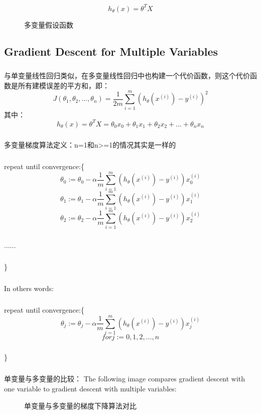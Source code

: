 \documentclass{article}
\begin{document}
\begin{CJK}{UTF8}{gbsn}
\begin{equation}
\end{equation}
\begin{equation}
h_\theta(x)=\theta^TX
\end{equation}
\begin{figure}[H]
\caption{多变量假设函数}
\label{fig:222}
\end{figure}
\subsection{Gradient Descent for Multiple Variables}
\subparagraph*{}
与单变量线性回归类似，在多变量线性回归中也构建一个代价函数，则这个代价函数是所有建模误差的平方和，即：
\begin{equation}
J(\theta_1,\theta_2,...,\theta_n)=\frac{1}{2m}\sum_{i=1}^m{(h_\theta(x^{(i)})-y^{(i)})^2}
\end{equation}
其中：
\begin{equation}
h_\theta(x)=\theta^TX=\theta_0x_0+\theta_1x_1+\theta_2x_2+...+\theta_nx_n
\end{equation}
\subparagraph*{}
多变量梯度算法定义：n=1和n>=1的情况其实是一样的
\subparagraph*{}
repeat until convergence:\{{}
\begin{equation}
\theta_0:=\theta_0-\alpha\frac{1}{m}\sum_{i=1}^m({h_\theta(x^{(i)})-y^{(i)}})x_0^{(i)}
\end{equation}
\begin{equation}
\theta_1:=\theta_1-\alpha\frac{1}{m}\sum_{i=1}^m({h_\theta(x^{(i)})-y^{(i)}})x_1^{(i)}
\end{equation}
\begin{equation}
\theta_2:=\theta_2-\alpha\frac{1}{m}\sum_{i=1}^m({h_\theta(x^{(i)})-y^{(i)}})x_2^{(i)}
\end{equation}
\subparagraph*{}
......
\subparagraph*{}
\}{}
\subparagraph*{}
In others words:
\subparagraph*{}
repeat until convergence:\{{}
\begin{equation}
\theta_j:=\theta_j-\alpha\frac{1}{m}\sum_{i=1}^m({h_\theta(x^{(i)})-y^{(i)}})x_j^{(i)}   
\end{equation}
\begin{equation}
for j:=0,1,2,...,n
\end{equation}
\subparagraph*{}
\}{}
\subparagraph*{}
单变量与多变量的比较：
The following image compares gradient descent with one variable to gradient descent with multiple variables: 
\begin{figure}[H]
\caption{单变量与多变量的梯度下降算法对比}
\label{fig:223}
\end{figure}

\end{CJK}
\end{document}
